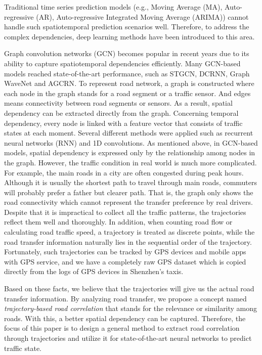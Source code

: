 Traditional time series prediction models (e.g., Moving Average (MA), Auto-regressive (AR), Auto-regressive Integrated Moving Average (ARIMA)) cannot handle such spatiotemporal prediction scenarios well. Therefore, to address the complex dependencies, deep learning methods have been introduced to this area.

Graph convolution networks (GCN)\cite{GCN0} becomes popular in recent years due to its ability to capture spatiotemporal dependencies efficiently. Many GCN-based models reached state-of-the-art performance, such as STGCN\cite{STGCN}, DCRNN\cite{DCRNN}, Graph WaveNet\cite{GWNET} and AGCRN\cite{AGCRN}. To represent road network, a graph is constructed where each node in the graph stands for a road segment or a traffic sensor. And edges means connectivity between road segments or sensors. As a result, spatial dependency can be extracted directly from the graph. Concerning temporal dependency, every node is linked with a feature vector that consists of traffic states at each moment. Several different methods were applied such as recurrent neural networks (RNN) and 1D convolutions. As mentioned above, in GCN-based models, spatial dependency is expressed only by the relationship among nodes in the graph. However, the traffic condition in real world is much more complicated. For example, the main roads in a city are often congested during peak hours. Although it is usually the shortest path to travel through main roads, commuters will probably prefer a father but clearer path. That is, the graph only shows the road connectivity which cannot represent the transfer preference by real drivers. Despite that it is impractical to collect all the traffic patterns, the trajectories reflect them well and thoroughly. In addition, when counting road flow or calculating road traffic speed, a trajectory is treated as discrete points, while the road transfer information naturally lies in the sequential order of the trajectory. Fortunately, such trajectories can be tracked by GPS devices and mobile apps with GPS service, and we have a completely raw GPS dataset which is copied directly from the logs of GPS devices in Shenzhen's taxis.

Based on these facts, we believe that the trajectories will give us the actual road transfer information. By analyzing road transfer, we propose a concept named \textit{trajectory-based road correlation} that stands for the relevance or similarity among roads. With this, a better spatial dependency can be captured. Therefore, the focus of this paper is to design a general method to extract road correlation through trajectories and utilize it for state-of-the-art neural networks to predict traffic state.

